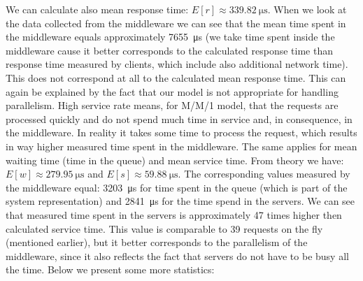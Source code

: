 \documentclass[11pt]{article}
\begin{document}
We can calculate also mean response time:
$E[r] 
\approx \SI{339.82}{\micro\second}$.
When we look at the data collected from the middleware we can see that the mean time spent in the middleware equals approximately \SI{7655}{\micro\second} (we take time spent inside the middleware cause it better corresponds to the calculated response time than response time measured by clients, which include also additional network time). This does not correspond at all to the calculated mean response time. This can again be explained by the fact that our model is not appropriate for handling parallelism. High service rate means, for M/M/1 model, that the requests are processed quickly and do not spend much time in service and, in consequence, in the middleware. In reality it takes some time to process the request, which results in way higher measured time spent in the middleware. The same applies for mean waiting time (time in the queue) and mean service time. From theory we have:
$E[w] 
\approx \SI{279.95}{\micro\second}$ and
$E[s] 
\approx \SI{59.88}{\micro\second}$.
The corresponding values measured by the middleware equal: \SI{3203}{\micro\second} for time spent in the queue (which is part of the system representation) and \SI{2841}{\micro\second} for the time spend in the servers. We can see that measured time spent in the servers is approximately 47 times higher then calculated service time. This value is comparable to 39 requests on the fly (mentioned earlier), but it better corresponds to the parallelism of the middleware, since it also reflects the fact that servers do not have to be busy all the time. Below we present some more statistics:
\end{document}
